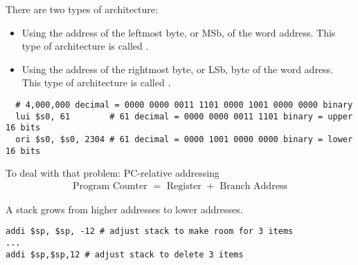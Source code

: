 \begin{multicols}{2}

    \par There are two types of architecture:
    \begin{itemize}
      \item Using the address of the leftmost byte, or MSb, of the word address.
        This type of architecture is called .
      \item Using the address of the rightmost byte, or LSb, byte of the word
        adress. This type of architecture is called .
    \end{itemize}

    \begin{lstlisting}
  # 4,000,000 decimal = 0000 0000 0011 1101 0000 1001 0000 0000 binary
  lui $s0, 61        # 61 decimal = 0000 0000 0011 1101 binary = upper 16 bits
  ori $s0, $s0, 2304 # 61 decimal = 0000 1001 0000 0000 binary = lower 16 bits
    \end{lstlisting}
      \par To deal with that problem: PC-relative addressing
        \begin{align*}
          \mbox{ Program Counter } = \mbox{ Register } + \mbox { Branch Address }
        \end{align*}

    \par A stack grows from higher addresses to lower addresses.
            \begin{lstlisting}
addi $sp, $sp, -12 # adjust stack to make room for 3 items
...
addi $sp,$sp,12 # adjust stack to delete 3 items
            \end{lstlisting}

\end{multicols}
\noindent\makebox[\linewidth]{\rule{\paperwidth}{0.4pt}}